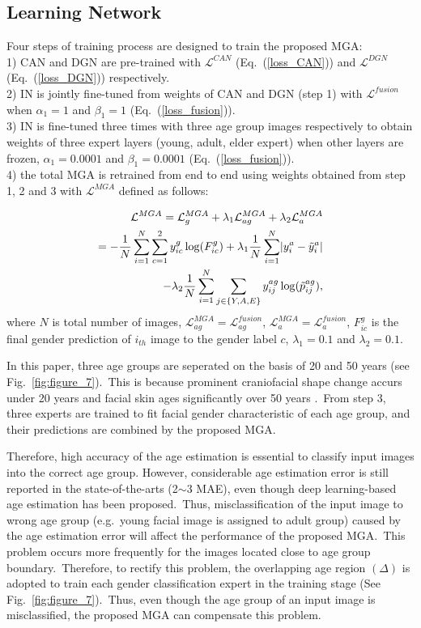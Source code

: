 \documentclass[10pt,twocolumn,letterpaper]{article}
\begin{document}
\subsection{Learning Network}
\label{Learning Network}
Four steps of training process are designed to train the proposed MGA:\\ 
1) CAN and DGN are pre-trained with $\mathcal{L}^{CAN}$ (Eq.~(\ref{loss_CAN})) and $\mathcal{L}^{DGN}$ (Eq.~(\ref{loss_DGN})) respectively.\\
2) IN is jointly fine-tuned from weights of CAN and DGN (step 1) with $\mathcal{L}^{fusion}$ when $\alpha_1=1$ and $\beta_1=1$ (Eq.~(\ref{loss_fusion})).\\
3) IN is fine-tuned three times with three age group images respectively to obtain weights of three expert layers (young, adult, elder expert) when other layers are frozen, $\alpha_1=0.0001$ and $\beta_1=0.0001$ (Eq.~(\ref{loss_fusion})).\\
4) the total MGA is retrained from end to end using weights obtained from step 1, 2 and 3 with $\mathcal{L}^{MGA}$ defined as follows:

\begin{align}
\label{loss function of MGA}
    \mathcal{L}^{MGA}=\mathcal{L}_g^{MGA}+\lambda_1\mathcal{L}_{ag}^{MGA}+\lambda_2\mathcal{L}_a^{MGA}\nonumber\\
    =-\frac{1}{N}\sum_{i=1}^N\sum_{c=1}^2y_{ic}^g\log(F_{ic}^g)+\lambda_1\frac{1}{N}\sum_{i=1}^N\lvert y_i^{a}    -\Tilde{y}_i^a\rvert\\-\lambda_2\frac{1}{N}\sum_{i=1}^N\sum_{j\in\{Y,A,E\}}y_{ij}^{ag}\log(\Tilde{p}^{ag}_{ij})\nonumber,
\end{align}
where $N$ is total number of images, $\mathcal{L}_{ag}^{MGA}=\mathcal{L}_{ag}^{fusion}$, $\mathcal{L}_{a}^{MGA}=\mathcal{L}_{a}^{fusion}$, $F_{ic}^{g}$ is the final gender prediction of $i_{th}$ image to the gender label $c$, $\lambda_1=0.1$ and $\lambda_2=0.1$.

In this paper, three age groups are seperated on the basis of 20 and 50 years (see Fig.~\ref{fig:figure_7}).~This is because prominent craniofacial shape change accurs under 20 years and facial skin ages significantly over 50 years \cite{Guo2009}.~From step 3, three experts are trained to fit facial gender characteristic of each age group, and their predictions are combined by the proposed MGA.

Therefore, high accuracy of the age estimation is essential to classify input images into the correct age group. However, considerable age estimation error is still reported in the state-of-the-arts (2$\sim$3 MAE), even though deep learning-based age estimation has been proposed.~Thus, misclassification of the input image to wrong age group (e.g.~young facial image is assigned to adult group) caused by the age estimation error will affect the performance of the proposed MGA.~This problem occurs more frequently for the images located close to age group boundary.~Therefore, to rectify this problem, the overlapping age region $(\Delta)$ is adopted to train each gender classification expert in the training stage (See Fig.~\ref{fig:figure_7}).~Thus, even though the age group of an input image is misclassified, the proposed MGA can compensate this problem.
\end{document}
